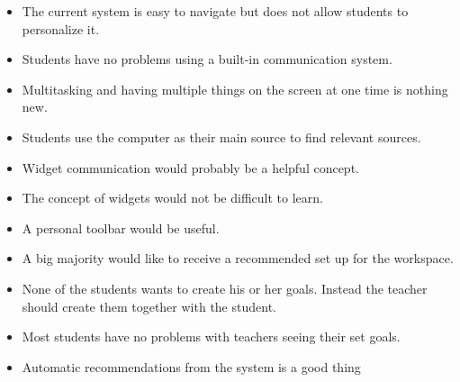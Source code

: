 \begin {itemize}
	\item The current system is easy to navigate but does not allow students to personalize it.
	\item Students have no problems using a built-in communication system.
	\item Multitasking and having multiple things on the screen at one time is nothing new.
	\item Students use the computer as their main source to find relevant sources.
	\item Widget communication would probably be a helpful concept.
	\item The concept of widgets would not be difficult to learn.
	\item A personal toolbar would be useful.
	\item A big majority would like to receive a recommended set up for the workspace.
	\item None of the students wants to create his or her goals. Instead the teacher should create them together with the student.
	\item Most students have no problems with teachers seeing their set goals.
	\item Automatic recommendations from the system is a good thing
\end {itemize}
